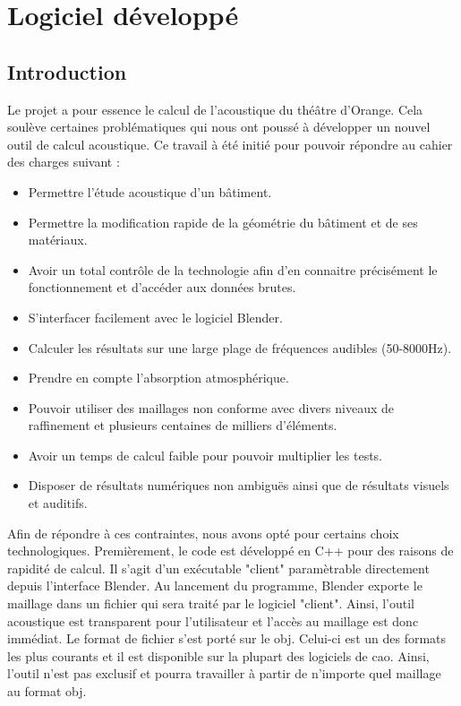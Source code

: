 		
\chapter{Logiciel développé}
	\minitoc
	\newpage
	
\section{Introduction}
Le projet a pour essence le calcul de l'acoustique du théâtre d'Orange. Cela soulève certaines problématiques qui nous ont poussé à développer un nouvel outil de calcul acoustique. Ce travail à été initié pour pouvoir répondre au cahier des charges suivant :
\begin{itemize}
	\item Permettre l'étude acoustique d'un bâtiment.
	\item Permettre la modification rapide de la géométrie du bâtiment et de ses matériaux.
	\item Avoir un total contrôle de la technologie afin d'en connaitre précisément le fonctionnement et d'accéder aux données brutes.
	\item S'interfacer facilement avec le logiciel Blender.
	\item Calculer les résultats sur une large plage de fréquences audibles (50-8000Hz).
	\item Prendre en compte l'absorption atmosphérique.
	\item Pouvoir utiliser des maillages non conforme avec divers niveaux de raffinement et plusieurs centaines de milliers d'éléments.
	\item Avoir un temps de calcul faible pour pouvoir multiplier les tests.
	\item Disposer de résultats numériques non ambiguës ainsi que de résultats visuels et auditifs.
\end{itemize}

Afin de répondre à ces contraintes, nous avons opté pour certains choix technologiques. Premièrement, le code est développé en C++ pour des raisons de rapidité de calcul. Il s'agit d'un exécutable "client" paramètrable directement depuis l'interface Blender. Au lancement du programme, Blender exporte le maillage dans un fichier qui sera traité par le logiciel "client". Ainsi, l'outil acoustique est transparent pour l'utilisateur et l'accès au maillage est donc immédiat. Le format de fichier s'est porté sur le \gls{obj}. Celui-ci est un des formats les plus courants et il est disponible sur la plupart des logiciels de \gls{cao}. Ainsi, l'outil n'est pas exclusif et pourra travailler à partir de n'importe quel maillage au format \gls{obj}.

